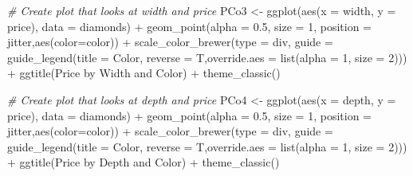 \documentclass[
]{article}
\newenvironment{Shaded}{\begin{snugshade}}{\end{snugshade}}
\newcommand{\AttributeTok}[1]{\textcolor[rgb]{0.77,0.63,0.00}{#1}}
\newcommand{\CommentTok}[1]{\textcolor[rgb]{0.56,0.35,0.01}{\textit{#1}}}
\newcommand{\DecValTok}[1]{\textcolor[rgb]{0.00,0.00,0.81}{#1}}
\newcommand{\FloatTok}[1]{\textcolor[rgb]{0.00,0.00,0.81}{#1}}
\newcommand{\FunctionTok}[1]{\textcolor[rgb]{0.00,0.00,0.00}{#1}}
\newcommand{\NormalTok}[1]{#1}
\newcommand{\OtherTok}[1]{\textcolor[rgb]{0.56,0.35,0.01}{#1}}
\newcommand{\SpecialCharTok}[1]{\textcolor[rgb]{0.00,0.00,0.00}{#1}}
\newcommand{\StringTok}[1]{\textcolor[rgb]{0.31,0.60,0.02}{#1}}
\begin{document}
\begin{Shaded}
\begin{Highlighting}[]
\CommentTok{\# Create plot that looks at width and price}
\NormalTok{PCo3 }\OtherTok{\textless{}{-}} \FunctionTok{ggplot}\NormalTok{(}\FunctionTok{aes}\NormalTok{(}\AttributeTok{x =}\NormalTok{ width, }\AttributeTok{y =}\NormalTok{ price), }\AttributeTok{data =}\NormalTok{ diamonds) }\SpecialCharTok{+} \FunctionTok{geom\_point}\NormalTok{(}\AttributeTok{alpha =} \FloatTok{0.5}\NormalTok{, }\AttributeTok{size =} \DecValTok{1}\NormalTok{, }\AttributeTok{position =} \StringTok{\textquotesingle{}jitter\textquotesingle{}}\NormalTok{,}\FunctionTok{aes}\NormalTok{(}\AttributeTok{color=}\NormalTok{color)) }\SpecialCharTok{+}
  \FunctionTok{scale\_color\_brewer}\NormalTok{(}\AttributeTok{type =} \StringTok{\textquotesingle{}div\textquotesingle{}}\NormalTok{, }\AttributeTok{guide =} \FunctionTok{guide\_legend}\NormalTok{(}\AttributeTok{title =} \StringTok{\textquotesingle{}Color\textquotesingle{}}\NormalTok{, }\AttributeTok{reverse =}\NormalTok{ T,}\AttributeTok{override.aes =} \FunctionTok{list}\NormalTok{(}\AttributeTok{alpha =} \DecValTok{1}\NormalTok{, }\AttributeTok{size =} \DecValTok{2}\NormalTok{)))       }\SpecialCharTok{+} \FunctionTok{ggtitle}\NormalTok{(}\StringTok{\textquotesingle{}Price by Width and Color\textquotesingle{}}\NormalTok{) }\SpecialCharTok{+} \FunctionTok{theme\_classic}\NormalTok{()}

\CommentTok{\# Create plot that looks at depth and price}
\NormalTok{PCo4 }\OtherTok{\textless{}{-}} \FunctionTok{ggplot}\NormalTok{(}\FunctionTok{aes}\NormalTok{(}\AttributeTok{x =}\NormalTok{ depth, }\AttributeTok{y =}\NormalTok{ price), }\AttributeTok{data =}\NormalTok{ diamonds) }\SpecialCharTok{+} \FunctionTok{geom\_point}\NormalTok{(}\AttributeTok{alpha =} \FloatTok{0.5}\NormalTok{, }\AttributeTok{size =} \DecValTok{1}\NormalTok{, }\AttributeTok{position =} \StringTok{\textquotesingle{}jitter\textquotesingle{}}\NormalTok{,}\FunctionTok{aes}\NormalTok{(}\AttributeTok{color=}\NormalTok{color)) }\SpecialCharTok{+}
  \FunctionTok{scale\_color\_brewer}\NormalTok{(}\AttributeTok{type =} \StringTok{\textquotesingle{}div\textquotesingle{}}\NormalTok{, }\AttributeTok{guide =} \FunctionTok{guide\_legend}\NormalTok{(}\AttributeTok{title =} \StringTok{\textquotesingle{}Color\textquotesingle{}}\NormalTok{, }\AttributeTok{reverse =}\NormalTok{ T,}\AttributeTok{override.aes =} \FunctionTok{list}\NormalTok{(}\AttributeTok{alpha =} \DecValTok{1}\NormalTok{, }\AttributeTok{size =} \DecValTok{2}\NormalTok{)))       }\SpecialCharTok{+} \FunctionTok{ggtitle}\NormalTok{(}\StringTok{\textquotesingle{}Price by Depth and Color\textquotesingle{}}\NormalTok{) }\SpecialCharTok{+} \FunctionTok{theme\_classic}\NormalTok{()}


\end{Highlighting}
\end{Shaded}
\end{document}
